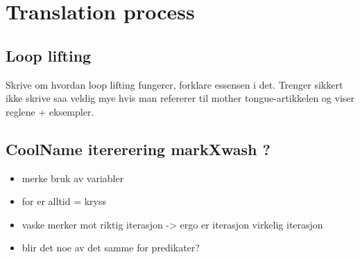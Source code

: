 \chapter{Translation process}
\section{Loop lifting}
\label{sect:method:loop_lifting}
Skrive om hvordan loop lifting fungerer, forklare essensen i det. Trenger
sikkert ikke skrive saa veldig mye hvis man refererer til mother
tongue-artikkelen og viser reglene + eksempler. 

\section{CoolName itererering markXwash ?}
\label{sect:method:madslifting}
\begin{itemize}
\item merke bruk av variabler
\item for er alltid = kryss
\item vaske merker mot riktig iterasjon -> ergo er iterasjon virkelig iterasjon
\item blir det noe av det samme for predikater?
\end{itemize}